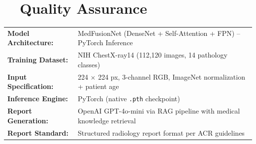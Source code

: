 \documentclass[11pt, a4paper]{article}
\begin{document}
\vspace{0.6em}

\section*{\faCheckCircle\ \ Quality Assurance}

\begin{patientcard}
\begin{tabularx}{\textwidth}{@{}>{\bfseries\small}l >{\small}X@{}}
	Model Architecture: & MedFusionNet (DenseNet + Self-Attention + FPN) -- PyTorch Inference \\
	Training Dataset: & NIH ChestX-ray14 (112,120 images, 14 pathology classes) \\
	Input Specification: & 224 $\times$ 224 px, 3-channel RGB, ImageNet normalization + patient age \\
	Inference Engine: & PyTorch (native \texttt{.pth} checkpoint) \\
	Report Generation: & OpenAI GPT-4o-mini via RAG pipeline with medical knowledge retrieval \\
	Report Standard: & Structured radiology report format per ACR guidelines \\
\end{tabularx}
\end{patientcard}

\vspace{0.8em}
\end{document}
